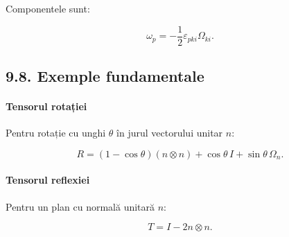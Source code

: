 \documentclass[12pt,a4paper]{article}
\begin{document}
Componentele sunt:


\[
\omega_p = -\frac{1}{2} \varepsilon_{pki} \Omega_{ki}.
\]



\subsection{9.8. Exemple fundamentale}

\paragraph{Tensorul rotației}
Pentru rotație cu unghi $\theta$ în jurul vectorului unitar $n$:


\[
R = (1-\cos\theta)(n \otimes n) + \cos\theta\, I + \sin\theta\, \Omega_n.
\]



\paragraph{Tensorul reflexiei}
Pentru un plan cu normală unitară $n$:


\[
T = I - 2 n \otimes n.
\]
\end{document}
